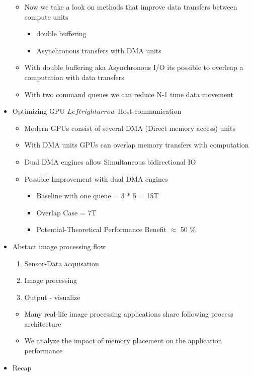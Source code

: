 \documentclass[paper=a4, fontsize=11pt]{scrartcl} %
\numberwithin{equation}{section} %
\numberwithin{figure}{section} %
\numberwithin{table}{section} %
\begin{document}
\begin{itemize}
\begin{itemize}
    \item Now we take a look on methods that improve data transfers between compute units
    \begin{itemize}
      \item double buffering
      \item Asynchronous transfers with DMA units
    \end{itemize}
    \item With double buffering aka Asynchronous I/O its possible to overleap a computation with data transfers
    \item With two command queues we can reduce N-1 time data movement
  \end{itemize}
  \item Optimizing GPU $Leftrightarrow$ Host communication
  \begin{itemize}
    \item Modern GPUs consist of several DMA (Direct memory access) units
    \item With DMA units GPUs can overlap memory transfers with computation
    \item Dual DMA engines allow Simultaneous bidirectional IO
    \item Possible Improvement with dual DMA engines
    \begin{itemize}
      \item Baseline with one queue = 3 * 5 = 15T
      \item Overlap Case = 7T
      \item Potential-Theoretical Performance Benefit $\approx$ 50 \%
    \end{itemize}
  \end{itemize}
  \item Abstact image processing flow
  \begin{enumerate}
    \item Sensor-Data acquisation
    \item Image processing
    \item Output - visualize
  \end{enumerate}
  \begin{itemize}
    \item Many real-life image processing applications share following process architecture
    \item We analyze the impact of memory placement on the application performance
  \end{itemize}
  \item Recap
  \begin{itemize}

\end{itemize}
\end{itemize}
\end{document}
